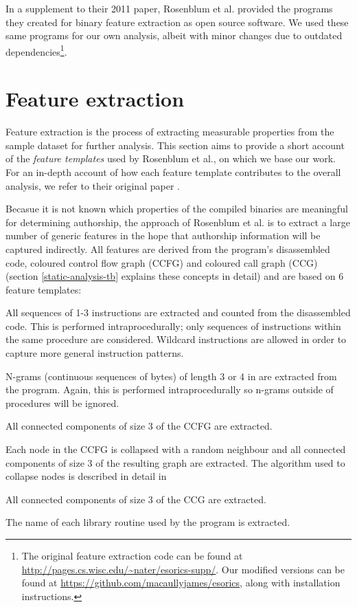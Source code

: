 \documentclass[a4paper,11pt]{kth-mag}
\begin{document}
In a supplement to their 2011 paper, Rosenblum et al. provided the programs
they created for binary feature extraction as open source software. We used
these same programs for our own analysis, albeit with minor changes due to
outdated dependencies\footnote{
    The original feature extraction code can be found at
    \url{http://pages.cs.wisc.edu/~nater/esorics-supp/}. Our modified versions
    can be found at \url{https://github.com/macaullyjames/esorics}, along with
    installation instructions.
}.

\section{Feature extraction}
Feature extraction is the process of extracting measurable properties from the
sample dataset for further analysis. This section aims to provide a short
account of the \emph{feature templates} used by Rosenblum et al., on which we
base our work. For an in-depth account of how each feature template contributes
to the overall analysis, we refer to their original paper
\parencite{rosenblum2011wrote}.

Becasue it is not known which properties of the compiled binaries are
meaningful for determining authorship, the approach of Rosenblum et al. is to
extract a large number of generic features in the hope that authorship
information will be captured indirectly. All features are derived from the
program's disassembled code, coloured control flow graph (CCFG) and coloured
call graph (CCG) (section \ref{static-analysis-tb} explains these concepts in
detail) and are based on 6 feature templates: 

\begin{description}[style=nextline]
\item[Idioms]
All sequences of 1-3 instructions are extracted and counted from the
disassembled code. This is performed intraprocedurally; only sequences of
instructions within the same procedure are considered. Wildcard instructions
are allowed in order to capture more general instruction patterns.

\item[N-grams]
N-grams (continuous sequences of bytes) of length 3 or 4 in are extracted from
the program. Again, this is performed intraprocedurally so n-grams outside of
procedures will be ignored.

\item[Graphlets]
All connected components of size 3 of the CCFG are extracted.

\item[Supergraphlets]
Each node in the CCFG is collapsed with a random neighbour and all connected
components of size 3 of the resulting graph are extracted. The algorithm used
to collapse nodes is described in detail in \parencite{rosenblum2011recovering} 

\item[Call graphlets]
All connected components of size 3 of the CCG are extracted.

\item[External interaction]
The name of each library routine used by the program is extracted.
\end{description}
\end{document}
